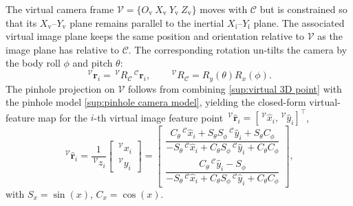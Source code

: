 \documentclass[10pt,journal]{IEEEtran}
\begin{document}
The virtual camera frame $\mathcal{V}=\{O_{\text{v}}~X_{\text{v}}~Y_{\text{v}}~Z_{\text{v}}\}$ moves with $\mathcal{C}$ but is constrained so that its $X_{\text{v}}$--$Y_{\text{v}}$ plane remains parallel to the inertial $X_{\text{i}}$--$Y_{\text{i}}$ plane. The associated virtual image plane keeps the same position and orientation relative to $\mathcal{V}$ as the image plane has relative to $\mathcal{C}$. The corresponding rotation un-tilts the camera by the body roll $\phi$ and pitch $\theta$:
\begin{equation}
\label{sup:virtual 3D point}
    \,^\mathcal{V}\boldsymbol{r}_i = \,^\mathcal{V}R_\mathcal{C}\,^\mathcal{C}\boldsymbol{r}_i, \qquad \,^\mathcal{V}R_\mathcal{C} = R_y(\theta)R_x(\phi).
\end{equation}
The pinhole projection on $\mathcal{V}$ follows from combining \eqref{sup:virtual 3D point} with the pinhole model \eqref{sup:pinhole camera model}, yielding the closed-form virtual-feature map for the $i$-th virtual image feature point $\,^\mathcal{V}\hat{\boldsymbol{r}}_i=[\,^\mathcal{V}\hat{x}_i,\,^\mathcal{V}\hat{y}_i]^\top$,
\begin{equation}
\label{sup:virtual feature point}
    \,^\mathcal{V}\hat{\boldsymbol{r}}_i = \frac{1}{\,^\mathcal{V}z_i}\begin{bmatrix} \,^\mathcal{V}x_i \\ \,^\mathcal{V}y_i \end{bmatrix} = \begin{bmatrix}
        \dfrac{C_\theta\,^\mathcal{C}\hat{x}_i + S_\theta S_\phi\,^\mathcal{C}\hat{y}_i + S_\theta C_\phi}{-S_\theta\,^\mathcal{C}\hat{x}_i + C_\theta S_\phi\,^\mathcal{C}\hat{y}_i + C_\theta C_\phi} \\[4pt]
        \dfrac{C_\theta\,^\mathcal{C}\hat{y}_i - S_\phi}{-S_\theta\,^\mathcal{C}\hat{x}_i + C_\theta S_\phi\,^\mathcal{C}\hat{y}_i + C_\theta C_\phi}
    \end{bmatrix},
\end{equation}
with $S_x=\sin(x)$, $C_x=\cos(x)$.
\end{document}

